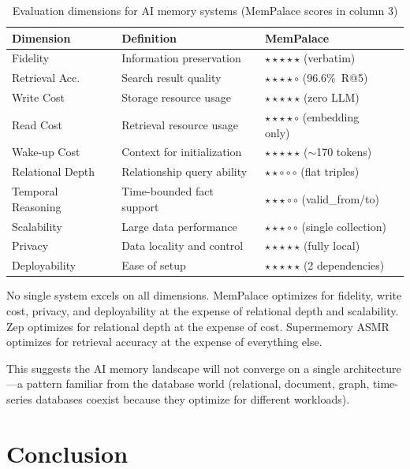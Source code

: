 \documentclass[twoside,11pt]{article}
\begin{document}
\begin{table}[t]
\centering
\caption{Evaluation dimensions for AI memory systems (MemPalace scores in column 3)}
\label{tab:framework}
\begin{tabular}{@{}llll@{}}
\toprule
\textbf{Dimension} & \textbf{Definition} & \textbf{MemPalace} \\
\midrule
Fidelity         & Information preservation   & $\star\star\star\star\star$ (verbatim) \\
Retrieval Acc.   & Search result quality      & $\star\star\star\star\circ$ (96.6\%\ R@5) \\
Write Cost       & Storage resource usage     & $\star\star\star\star\star$ (zero LLM) \\
Read Cost        & Retrieval resource usage   & $\star\star\star\star\circ$ (embedding only) \\
Wake-up Cost     & Context for initialization & $\star\star\star\star\star$ ($\sim$170 tokens) \\
Relational Depth & Relationship query ability & $\star\star\circ\circ\circ$ (flat triples) \\
Temporal Reasoning & Time-bounded fact support & $\star\star\star\circ\circ$ (valid\_from/to) \\
Scalability      & Large data performance     & $\star\star\star\circ\circ$ (single collection) \\
Privacy          & Data locality and control  & $\star\star\star\star\star$ (fully local) \\
Deployability    & Ease of setup              & $\star\star\star\star\star$ (2 dependencies) \\
\bottomrule
\end{tabular}
\end{table}

No single system excels on all dimensions.  MemPalace optimizes for fidelity,
write cost, privacy, and deployability at the expense of relational depth and
scalability.  Zep optimizes for relational depth at the expense of cost.
Supermemory ASMR optimizes for retrieval accuracy at the expense of everything
else.

This suggests the AI memory landscape will not converge on a single
architecture---a pattern familiar from the database world (relational,
document, graph, time-series databases coexist because they optimize for
different workloads).

\section{Conclusion}
\label{sec:conclusion}
\end{document}
